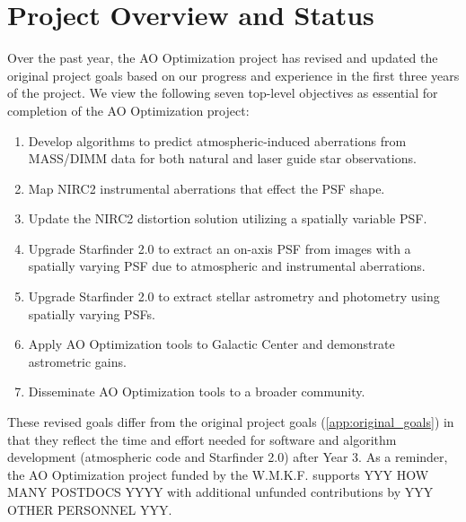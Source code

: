 \section{Project Overview and Status}
\label{sec:overview}

Over the past year, the AO Optimization project has revised and
updated the original project goals based on our progress and
experience in the first three years of the project. We view the
following seven top-level objectives as essential for completion of
the AO Optimization project:
\begin{enumerate}
\item Develop algorithms to predict atmospheric-induced aberrations
  from MASS/DIMM data for both natural and laser guide star observations.
\item Map NIRC2 instrumental aberrations that effect the PSF shape.
\item Update the NIRC2 distortion solution utilizing a spatially
  variable PSF.
\item Upgrade Starfinder 2.0 to extract an on-axis PSF from images with
  a spatially varying PSF due to atmospheric and instrumental aberrations.
\item Upgrade Starfinder 2.0 to extract stellar astrometry and
  photometry using spatially varying PSFs.
\item Apply AO Optimization tools to Galactic Center and demonstrate
  astrometric gains.
\item Disseminate AO Optimization tools to a broader community.
\end{enumerate}
These revised goals differ from the original project goals 
(\ref{app:original_goals}) in that
they reflect the time and effort needed for software and
algorithm development (atmospheric code and Starfinder 2.0) after Year
3. As a reminder, the AO Optimization project funded by the
W.M.K.F. supports YYY HOW MANY POSTDOCS YYYY with additional unfunded 
contributions by YYY OTHER PERSONNEL YYY. 


